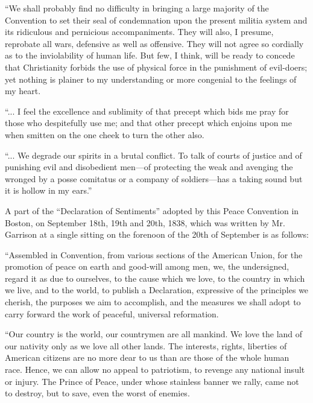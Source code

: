 \documentclass{book}
\begin{document}
“We shall probably find no difficulty in bringing a large majority of the Convention to set their seal of condemnation upon the present militia system and its ridiculous and pernicious accompaniments. They will also, I presume, reprobate all wars, defensive as well as offensive. They will not agree so cordially as to the inviolability of human life. But few, I think, will be ready to concede that Christianity forbids the use of physical force in the punishment of evil-doers; yet nothing is plainer to my understanding or more congenial to the feelings of my heart.

“... I feel the excellence and sublimity of that precept which bids me pray for those who despitefully use me; and that other precept which enjoins upon me when smitten on the one cheek to turn the other also.

“... We degrade our spirits in a brutal conflict. To talk of courts of justice and of punishing evil and disobedient men—of protecting the weak and avenging the wronged by a posse comitatus or a company of soldiers—has a taking sound but it is hollow in my ears.”\footnotemark[1]

A part of the “Declaration of Sentiments” adopted by this Peace Convention in Boston, on September 18th, 19th and 20th, 1838, which was written by Mr. Garrison at a single sitting on the forenoon of the 20th of September is as follows:

“Assembled in Convention, from various sections of the American Union, for the promotion of peace on earth and good-will among men, we, the undersigned, regard it as due to ourselves, to the cause which we love, to the country in which we live, and to the world, to publish a Declaration, expressive of the principles we cherish, the purposes we aim to accomplish, and the measures we shall adopt to carry forward the work of peaceful, universal reformation.

“Our country is the world, our countrymen are all mankind. We love the land of our nativity only as we love all other lands. The interests, rights, liberties of American citizens are no more dear to us than are those of the whole human race. Hence, we can allow no appeal to patriotism, to revenge any national insult or injury. The Prince of Peace, under whose stainless banner we rally, came not to destroy, but to save, even the worst of enemies.
\end{document}
